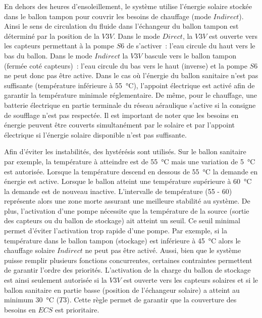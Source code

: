 En dehors des heures d’ensoleillement, le système utilise l’énergie solaire stockée dans
le ballon tampon pour couvrir les besoins de chauffage (mode $Indirect$). Ainsi le sens de
circulation du fluide dans l’échangeur du ballon tampon est déterminé par la position de
la $V3V$. Dans le mode $Direct$, la $V3V$ est ouverte vers les capteurs permettant à la
pompe $S6$ de s’activer~: l’eau circule du haut vers le bas du ballon. Dans le mode
$Indirect$ la $V3V$ bascule vers le ballon tampon (fermée coté capteurs)~: l’eau circule
du bas vers le haut (inverse) et la pompe $S6$ ne peut donc pas être active.
Dans le cas où l’énergie du ballon sanitaire n’est pas suffisante (température inférieure
à \SI{55}{\celsius}), l’appoint électrique est activé afin de garantir la température
minimale réglementaire. De même, pour le chauffage, une batterie électrique en partie
terminale du réseau aéraulique s’active si la consigne de soufflage n’est pas respectée.
Il est important de noter que les besoins en énergie peuvent être couverts simultanément
par le solaire et par l’appoint électrique si l’énergie solaire disponible n’est pas
suffisante.

Afin d’éviter les instabilités, des hystérésis sont utilisés. Sur le ballon sanitaire par
exemple, la température à atteindre est de \SI{55}{\celsius} mais une variation de
\SI{5}{\celsius} est autorisée. Lorsque la température descend en dessous de
\SI{55}{\celsius} la demande en énergie est active. Lorsque le ballon atteint une
température supérieure à \SI{60}{\celsius} la demande est de nouveau inactive.
L’intervalle de température (\num{55} - \num{60}) représente alors une zone morte assurant
une meilleure stabilité au système. De plus, l’activation d’une pompe nécessite que la
température de la source (sortie des capteurs ou du ballon de stockage) ait atteint un
seuil. Ce seuil minimal permet d’éviter l’activation trop rapide d’une pompe. Par exemple,
si la température dans le ballon tampon (stockage) est inférieure à \SI{45}{\celsius}
alors le chauffage solaire $Indirect$ ne peut pas être activé. Aussi, bien que le système
puisse remplir plusieurs fonctions concurrentes, certaines contraintes permettent de
garantir l’ordre des priorités. L’activation de la charge du ballon de stockage est ainsi
seulement autorisée si la $V3V$ est ouverte vers les capteurs solaires et si le ballon
sanitaire en partie basse (position de l’échangeur solaire) a atteint au minimum
\SI{30}{\celsius} ($T3$). Cette règle permet de garantir que la couverture des besoins en
$ECS$ est prioritaire.

